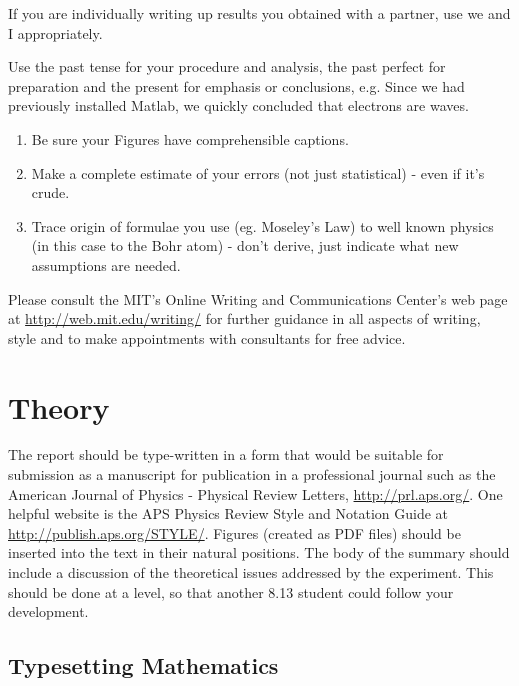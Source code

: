 If you are individually writing up results you obtained with a
partner, use we and I appropriately.

Use the past tense for your procedure and analysis, the past perfect
for preparation and the present for emphasis or conclusions, e.g.
Since we had previously installed Matlab, we quickly concluded that
electrons are waves.

\begin{enumerate}
\item Be sure your Figures have comprehensible captions.

\item Make a complete estimate of your errors (not just statistical) - even
if it's crude.

\item Trace origin of formulae you use (eg. Moseley's Law) to well known
physics (in this case to the Bohr atom) - don't derive, just
indicate what new assumptions are needed.
\end{enumerate}

Please consult the MIT's Online Writing and Communications
Center's web page at \url{http://web.mit.edu/writing/} for further
guidance in all aspects of writing, style and to make appointments
with consultants for free advice.  




\section{Theory}

The report should be type-written in a form that would be suitable
for submission as a manuscript for publication in a professional
journal such as the American Journal of Physics - Physical Review
Letters, \url{http://prl.aps.org/}.  One helpful website is the APS
Physics Review Style and Notation Guide at
\url{http://publish.aps.org/STYLE/}.  Figures (created as PDF files)
should be inserted into the text in their natural positions. The
body of the summary should include a discussion of the theoretical
issues addressed by the experiment.  This should be done at a level,
so that another 8.13 student could follow your development.

\subsection{Typesetting Mathematics}

